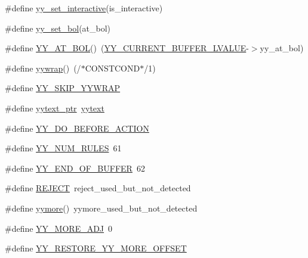 \begin{DoxyCompactItemize}
\item 
\#define \hyperlink{_genesys_09_09-scanner_8cpp_ac56eb96366c08862bf0efe5d83d1fc4c}{yy\-\_\-set\-\_\-interactive}(is\-\_\-interactive)
\item 
\#define \hyperlink{_genesys_09_09-scanner_8cpp_a12e30d13a76a94e78010db9996d39c50}{yy\-\_\-set\-\_\-bol}(at\-\_\-bol)
\item 
\#define \hyperlink{_genesys_09_09-scanner_8cpp_a71ca89b3656acd0552f14949a571560b}{Y\-Y\-\_\-\-A\-T\-\_\-\-B\-O\-L}()~(\hyperlink{_genesys_09_09-scanner_8cpp_a817a6a24af62508b5a35f4bed5f56a2e}{Y\-Y\-\_\-\-C\-U\-R\-R\-E\-N\-T\-\_\-\-B\-U\-F\-F\-E\-R\-\_\-\-L\-V\-A\-L\-U\-E}-\/$>$yy\-\_\-at\-\_\-bol)
\item 
\#define \hyperlink{_genesys_09_09-scanner_8cpp_ade1e2db9970733fbc3d9fecd09ce9771}{yywrap}()~(/$\ast$C\-O\-N\-S\-T\-C\-O\-N\-D$\ast$/1)
\item 
\#define \hyperlink{_genesys_09_09-scanner_8cpp_ae1ef5933028cbc587d31328e53d11a99}{Y\-Y\-\_\-\-S\-K\-I\-P\-\_\-\-Y\-Y\-W\-R\-A\-P}
\item 
\#define \hyperlink{_genesys_09_09-scanner_8cpp_a790a191a93ef4d3b8c0bb43fd7480052}{yytext\-\_\-ptr}~\hyperlink{_genesys_09_09-scanner_8cpp_a35b96d819f6a8f8638894c429e68b02a}{yytext}
\item 
\#define \hyperlink{_genesys_09_09-scanner_8cpp_acc3486d769af4e4b2820346a0093cc79}{Y\-Y\-\_\-\-D\-O\-\_\-\-B\-E\-F\-O\-R\-E\-\_\-\-A\-C\-T\-I\-O\-N}
\item 
\#define \hyperlink{_genesys_09_09-scanner_8cpp_ae558785bb896e090901c2b905f6790c6}{Y\-Y\-\_\-\-N\-U\-M\-\_\-\-R\-U\-L\-E\-S}~61
\item 
\#define \hyperlink{_genesys_09_09-scanner_8cpp_ab2708fd42cff29ce6a0a52b91bea40d1}{Y\-Y\-\_\-\-E\-N\-D\-\_\-\-O\-F\-\_\-\-B\-U\-F\-F\-E\-R}~62
\item 
\#define \hyperlink{_genesys_09_09-scanner_8cpp_a835f10dd1ab4bf9a80c4cd80ee6e3058}{R\-E\-J\-E\-C\-T}~reject\-\_\-used\-\_\-but\-\_\-not\-\_\-detected
\item 
\#define \hyperlink{_genesys_09_09-scanner_8cpp_a745d37b5e002b2e5f93ad42ea7b554be}{yymore}()~yymore\-\_\-used\-\_\-but\-\_\-not\-\_\-detected
\item 
\#define \hyperlink{_genesys_09_09-scanner_8cpp_a68792d73820bc46a71d3d4e613f0b977}{Y\-Y\-\_\-\-M\-O\-R\-E\-\_\-\-A\-D\-J}~0
\item 
\#define \hyperlink{_genesys_09_09-scanner_8cpp_a56858d18c7eda4f53664496ef566f651}{Y\-Y\-\_\-\-R\-E\-S\-T\-O\-R\-E\-\_\-\-Y\-Y\-\_\-\-M\-O\-R\-E\-\_\-\-O\-F\-F\-S\-E\-T}

\end{DoxyCompactItemize}
